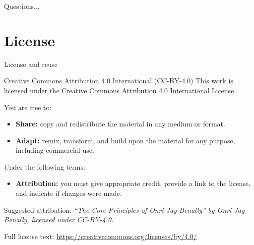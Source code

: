 \documentclass[presentation,aspectratio=169,11pt]{beamer}
\newcommand{\KeyTerm}[1]{\textbf{#1}}
\begin{document}
\begin{frame}[plain]
  \centering
  \Large Questions...
\end{frame}

\section{License}

\begin{frame}{License and reuse}
\justifying
\begin{block}{Creative Commons Attribution 4.0 International (CC-BY-4.0)}
\justifying
This work is licensed under the Creative Commons Attribution 4.0 International License.

You are free to:
\begin{itemize}
  \item \KeyTerm{Share:} copy and redistribute the material in any medium or format.
  \item \KeyTerm{Adapt:} remix, transform, and build upon the material for any purpose, including commercial use.
\end{itemize}

\vspace{0.4em}
Under the following terms:
\begin{itemize}
  \item \KeyTerm{Attribution:} you must give appropriate credit, provide a link to the license, and indicate if changes were made.
\end{itemize}
\end{block}

\vspace{0.6em}
\small
Suggested attribution: \emph{“The Core Principles of Onri Jay Benally” by Onri Jay Benally, licensed under CC-BY-4.0.}

\vspace{0.4em}
\footnotesize
Full license text: \href{https://creativecommons.org/licenses/by/4.0/}{https://creativecommons.org/licenses/by/4.0/}
\end{frame}
\end{document}
